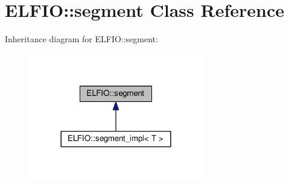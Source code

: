 \hypertarget{class_e_l_f_i_o_1_1segment}{}\section{E\+L\+F\+IO\+:\+:segment Class Reference}
\label{class_e_l_f_i_o_1_1segment}


Inheritance diagram for E\+L\+F\+IO\+:\+:segment\+:\nopagebreak
\begin{figure}[H]
\begin{center}
\leavevmode
\includegraphics[width=216pt]{class_e_l_f_i_o_1_1segment__inherit__graph}
\end{center}
\end{figure}
